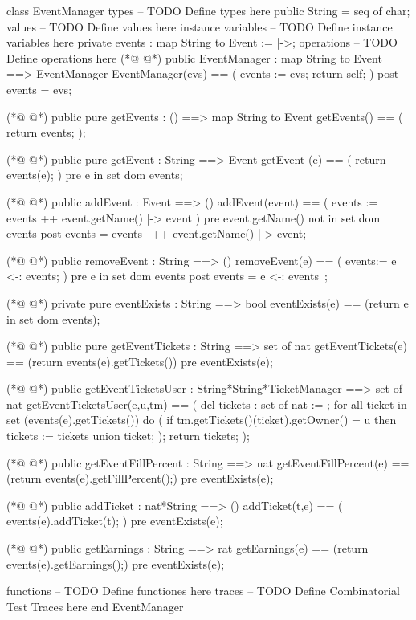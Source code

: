 \begin{vdmpp}[breaklines=true]
class EventManager
types
-- TODO Define types here
 public String = seq of char;
values
-- TODO Define values here
instance variables
-- TODO Define instance variables here
 private events : map String to Event := {|->};
operations
-- TODO Define operations here
(*@
\label{EventManager:12}
@*)
 public EventManager : map String to Event ==> EventManager
 EventManager(evs) == (
  events := evs;
  return self;
 )
 post events = evs;
 
(*@
\label{getEvents:19}
@*)
 public pure getEvents : () ==> map String to Event
 getEvents() == (
  return events;
 );
 
(*@
\label{getEvent:24}
@*)
 public pure getEvent : String ==> Event
 getEvent (e) == (
  return events(e);
 )
 pre e in set dom events;
 
(*@
\label{addEvent:30}
@*)
 public addEvent : Event ==> ()
 addEvent(event) == (
  events := events ++ {event.getName() |-> event}
 )
 pre event.getName() not in set dom events
 post events = events~ ++ {event.getName() |-> event};
 
(*@
\label{removeEvent:37}
@*)
 public removeEvent : String ==> ()
 removeEvent(e) == (
  events:= {e} <-: events; 
 )
 pre e in set dom events
 post events = {e} <-: events~; 
 
(*@
\label{eventExists:44}
@*)
 private pure eventExists : String ==> bool
 eventExists(e) == (return e in set dom events);
 
(*@
\label{getEventTickets:47}
@*)
 public pure getEventTickets : String ==> set of nat
 getEventTickets(e) == (return events(e).getTickets())
 pre eventExists(e);
 
(*@
\label{getEventTicketsUser:51}
@*)
 public getEventTicketsUser : String*String*TicketManager ==> set of nat
 getEventTicketsUser(e,u,tm) == (
  dcl tickets : set of nat := {};
  for all ticket in set (events(e).getTickets()) do 
  (
   if tm.getTickets()(ticket).getOwner() = u
    then tickets := tickets union {ticket};
  );
  return tickets;
 );
 
(*@
\label{getEventFillPercent:62}
@*)
 public getEventFillPercent : String ==> nat
 getEventFillPercent(e) == (return events(e).getFillPercent();)
 pre eventExists(e);
 
(*@
\label{addTicket:66}
@*)
 public addTicket : nat*String ==> ()
 addTicket(t,e) == (
  events(e).addTicket(t);
 )
 pre eventExists(e);
 
(*@
\label{getEarnings:72}
@*)
 public getEarnings : String ==> rat
 getEarnings(e) == (return events(e).getEarnings();)
 pre eventExists(e);
 

functions
-- TODO Define functiones here
traces
-- TODO Define Combinatorial Test Traces here
end EventManager
\end{vdmpp}
